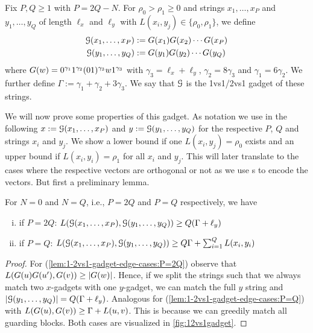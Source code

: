 \begin{definition}[1vs1/2vs1 Gadget]
Fix $P, Q \geq 1$ with $P = 2Q - N$.
For $\rho_0 > \rho_1 \geq 0$ and strings $x_1, \ldots, x_P$ and $y_1, \ldots, y_Q$ of length $\ell_x$ and $\ell_y$ with $L(x_i, y_j) \in \{\rho_0, \rho_1\}$, we define
\begin{align*}
	\mathcal{G}(x_1, \ldots, x_P) &:= G(x_1)G(x_2) \cdots G(x_P)\\
	\mathcal{G}(y_1, \ldots, y_Q) &:= G(y_1)G(y_2) \cdots G(y_Q)
\end{align*}
where $G(w) = 0^{\gamma_1}1^{\gamma_2}(01)^{\gamma_3}w1^{\gamma_3}$ with $\gamma_3 = \ell_x + \ell_y$, $\gamma_2 = 8\gamma_3$ and $\gamma_1 = 6\gamma_2$.
We further define $\Gamma := \gamma_1 + \gamma_2 + 3\gamma_3$.
We say that $\mathcal{G}$ is the 1vs1/2vs1 gadget of these strings.
\end{definition}

We will now prove some properties of this gadget.
As notation we use in the following $x := \mathcal{G}(x_1, \ldots, x_P)$ and $y := \mathcal{G}(y_1, \ldots, y_Q)$ for the respective $P$, $Q$ and strings $x_i$ and $y_j$.
We show a lower bound if one $L(x_i, y_j) = \rho_0$ exists and an upper bound if $L(x_i, y_i) = \rho_1$ for all $x_i$ and $y_j$.
This will later translate to the cases where the respective vectors are orthogonal or not as we use \nvgName{}s to encode the vectors.
But first a preliminary lemma.


\begin{lemma}
\label{lem:1-2vs1-gadget-edge-cases}
For $N = 0$ and $N = Q$, i.e., $P = 2Q$ and $P = Q$ respectively, we have
\begin{enumerate}[(i)]
\item\label{lem:1-2vs1-gadget-edge-cases:P=2Q} if $P = 2Q$: $L(\mathcal{G}(x_1, \ldots, x_P), \mathcal{G}(y_1, \ldots, y_Q)) \geq Q(\Gamma + \ell_y)$
\item\label{lem:1-2vs1-gadget-edge-cases:P=Q} if $P = Q$: $L(\mathcal{G}(x_1, \ldots, x_P), \mathcal{G}(y_1, \ldots, y_Q)) \geq Q\Gamma + \sum_{i = 1}^{Q} L(x_i, y_i)$
\end{enumerate}
\end{lemma}
\begin{proof}
For (\ref{lem:1-2vs1-gadget-edge-cases:P=2Q}) observe that $L(G(u)G(u'), G(v)) \geq |G(w)|$.
Hence, if we split the strings such that we always match two $x$-gadgets with one $y$-gadget, we can match the full $y$ string and $|\mathcal{G}(y_1, \ldots, y_Q)| = Q(\Gamma + \ell_y)$.
Analogous for (\ref{lem:1-2vs1-gadget-edge-cases:P=Q}) with $L(G(u), G(v)) \geq \Gamma + L(u,v)$.
This is because we can greedily match all guarding blocks.
Both cases are visualized in \autoref{fig:12vs1gadget}.
\end{proof}

